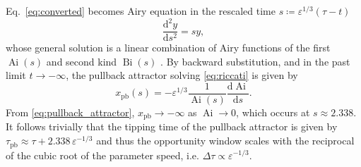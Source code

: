 \documentclass[11pt,a4paper]{article}
\theoremstyle{plain}
\theoremstyle{definition}
\theoremstyle{remark}
\newcommand{\dd}{\mathrm{d}}
\newcommand{\Ai}{\operatorname{Ai}}
\newcommand{\Bi}{\operatorname{Bi}}
\newcommand{\taupb}{\tau_{\mathrm{pb}}}
\begin{document}
%
Eq.~\eqref{eq:converted} becomes Airy equation in the rescaled time $s\coloneqq \varepsilon^{1/3}(\tau -t)$
%
\begin{equation}\label{eq:airy}
        \frac{\dd^2y}{\dd s^2} = sy,
\end{equation}
%
whose general solution is a linear combination of Airy functions of the first $\Ai(s)$ and second kind $\Bi(s)$ \cite[\S~$10.4$]{Abramowitz1965}.
By backward substitution, and in the past limit $t\to-\infty$, the pullback attractor solving \eqref{eq:riccati} is given by
%
\begin{equation}\label{eq:pullback_attractor}
        x_{\mathrm{pb}}(s) = -\varepsilon^{1/3}\frac{1}{\Ai(s)}\frac{\dd\Ai}{\dd s} .
\end{equation}
%
From \eqref{eq:pullback_attractor}, $x_{\mathrm{pb}}\to-\infty$ as $\Ai\to0$, which occurs at $s\approx2.338$.
It follows trivially that the tipping time of the pullback attractor is given by $\taupb \approx \tau + 2.338\,\varepsilon^{-1/3}$ and thus the opportunity window scales with the reciprocal of the cubic root of the parameter speed, i.e. $\Delta\tau\propto\varepsilon^{-1/3}$.
\end{document}
